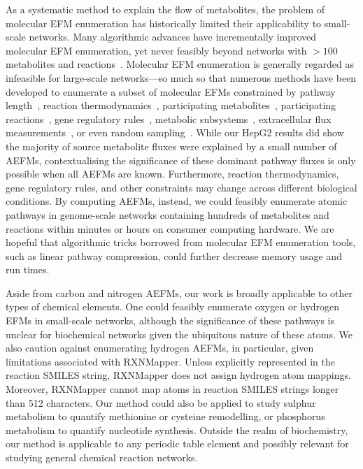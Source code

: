 \documentclass[12pt]{article}
\begin{document}
As a systematic method to explain the flow of metabolites, the problem of
molecular EFM enumeration has historically limited their applicability to
small-scale networks. Many algorithmic advances have incrementally
improved molecular EFM enumeration, yet never feasibly beyond networks
with $>100$ metabolites and
reactions~\citep{KampAxelvon2006M5fa,TerzerMarco2008Lcoe,vanKlinkenJanBert2016Faet}.
Molecular EFM enumeration is generally regarded as infeasible for
large-scale networks---so much so that numerous methods have been
developed to enumerate a subset of molecular EFMs constrained by pathway
length~\citep{deFigueiredoLuisF2009Ctse}, reaction
thermodynamics~\citep{GerstlMatthiasP2015Mief}, participating
metabolites~\citep{PeyJon2014Dcoe}, participating
reactions~\citep{KaletaChristoph2009Ctwb}, gene regulatory
rules~\citep{JungreuthmayerChristian2013rSue}, metabolic
subsystems~\citep{SchusterS2002Etps,SchwartzJean-Marc2007Omfa},
extracellular flux
measurements~\citep{SoonsZitaITA2011Iomm,JungersRaphaelM.2011Fcom}, or
even random sampling~\citep{MachadoDaniel2012Rsoe}. While our HepG2
results did show the majority of source metabolite fluxes were explained
by a small number of AEFMs, contextualising the significance of these
dominant pathway fluxes is only possible when all AEFMs are known.
Furthermore, reaction thermodynamics, gene regulatory rules, and other
constraints may change across different biological conditions. By
computing AEFMs, instead, we could feasibly enumerate atomic pathways in
genome-scale networks containing hundreds of metabolites and reactions
within minutes or hours on consumer computing hardware. We are hopeful
that algorithmic tricks borrowed from molecular EFM enumeration tools,
such as linear pathway compression, could further decrease memory usage
and run times.

Aside from carbon and nitrogen AEFMs, our work is broadly applicable to
other types of chemical elements. One could feasibly enumerate oxygen or
hydrogen EFMs in small-scale networks, although the significance of these
pathways is unclear for biochemical networks given the ubiquitous nature
of these atoms. We also caution against enumerating hydrogen AEFMs, in
particular, given limitations associated with RXNMapper. Unless explicitly
represented in the reaction SMILES string, RXNMapper does not assign
hydrogen atom mappings. Moreover, RXNMapper cannot map
atoms in reaction SMILES strings longer than 512 characters. Our method
could also be applied to study sulphur metabolism to quantify methionine
or cysteine remodelling, or phosphorus metabolism to quantify nucleotide
synthesis. Outside the realm of biochemistry, our method is applicable to
any periodic table element and possibly relevant for studying general
chemical reaction networks. 
\end{document}
